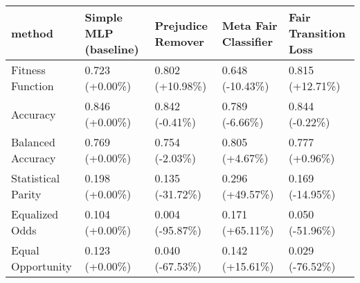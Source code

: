\begin{tabular}{lllll}
\toprule
method & Simple MLP (baseline) & Prejudice Remover & Meta Fair Classifier & Fair Transition Loss \\
\midrule
Fitness Function   &        0.723 (+0.00\%) &   0.802 (+10.98\%) &      0.648 (-10.43\%) &      0.815 (+12.71\%) \\
Accuracy           &        0.846 (+0.00\%) &    0.842 (-0.41\%) &       0.789 (-6.66\%) &       0.844 (-0.22\%) \\
Balanced Accuracy  &        0.769 (+0.00\%) &    0.754 (-2.03\%) &       0.805 (+4.67\%) &       0.777 (+0.96\%) \\
Statistical Parity &        0.198 (+0.00\%) &   0.135 (-31.72\%) &      0.296 (+49.57\%) &      0.169 (-14.95\%) \\
Equalized Odds     &        0.104 (+0.00\%) &   0.004 (-95.87\%) &      0.171 (+65.11\%) &      0.050 (-51.96\%) \\
Equal Opportunity  &        0.123 (+0.00\%) &   0.040 (-67.53\%) &      0.142 (+15.61\%) &      0.029 (-76.52\%) \\
\bottomrule
\end{tabular}
